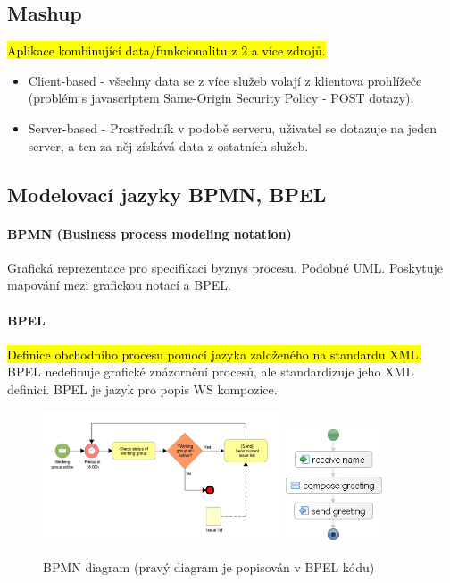 \subsection{Mashup}
\noindent \hl{Aplikace kombinující data/funkcionalitu z 2 a více zdrojů.}

\begin{itemize}[itemsep=0px,topsep=-2px]
\item Client-based - všechny data se z více služeb volají z klientova prohlížeče (problém s javascriptem Same-Origin Security Policy - POST dotazy).
\item Server-based - Prostředník v podobě serveru, uživatel se dotazuje na jeden server, a ten za něj získává data z ostatních služeb.
\end{itemize}

\subsection{Modelovací jazyky BPMN, BPEL}

\paragraph{BPMN (Business process modeling notation)} Grafická reprezentace pro specifikaci byznys procesu. Podobné UML. Poskytuje mapování mezi grafickou notací a BPEL.

\paragraph{BPEL} \hl{Definice obchodního procesu pomocí jazyka založeného na standardu XML.} BPEL nedefinuje grafické znázornění procesů, ale standardizuje jeho XML definici. BPEL je jazyk pro popis WS kompozice.

\begin{figure}[h!]
\centering
\includegraphics[width=70mm]{11/images/bpmn}
\hspace{10px}
\includegraphics[width=30mm]{11/images/bpel}
\caption{BPMN diagram (pravý diagram je popisován v BPEL kódu)}
\vspace{-10px}
\end{figure}

